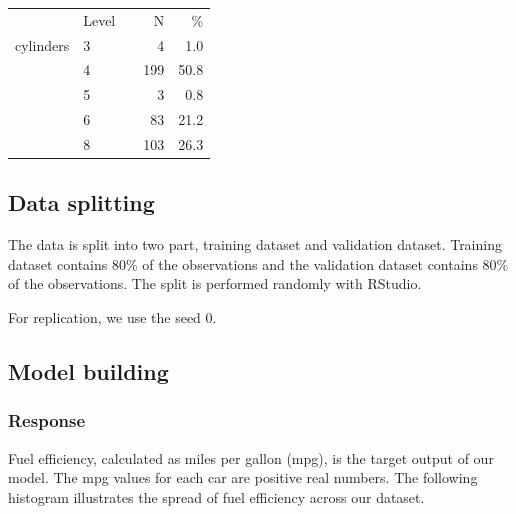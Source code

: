 \begin{center}
\begin{minipage}{\linewidth}
\begin{center}
\begin{tabular}{llrrr}
  \toprule
   & Level &   & N & \% \\ 
    \cmidrule{2-2} \cmidrule{4-5} 
 cylinders & 3 &  &   4 & 1.0 \\ 
   & 4 &  & 199 & 50.8 \\ 
   & 5 &  &   3 & 0.8 \\ 
   & 6 &  &  83 & 21.2 \\ 
   & 8 &  & 103 & 26.3 \\ 
   \bottomrule
\end{tabular}
\end{center}
\end{minipage}
\end{center}

\subsection{Data splitting}

The data is split into two part, training dataset and validation dataset. Training dataset contains 80$\%$ of the observations and the validation dataset contains 80$\%$ of the observations. The split is performed randomly with RStudio.

For replication, we use the seed 0.

\subsection{Model building}

\subsubsection{Response}

Fuel efficiency, calculated as miles per gallon (mpg), is the target output of our model. The mpg values for each car are positive real numbers. The following histogram illustrates the spread of fuel efficiency across our dataset.

